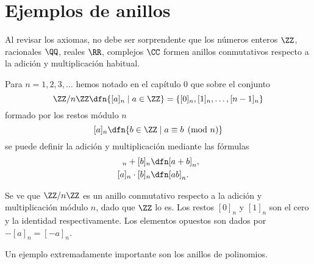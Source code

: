 
\section{Ejemplos de anillos}

\begin{ejemplo}
  Al revisar los axiomas, no debe ser sorprendente que los números enteros
  $\ZZ$, racionales $\QQ$, reales $\RR$, complejos $\CC$ formen anillos
  conmutativos respecto a la adición y multiplicación habitual.
\end{ejemplo}

\begin{ejemplo}
  \label{ejemplo:anillo-ZnZ}
  Para $n = 1, 2, 3, \ldots$ hemos notado en el capítulo 0 que sobre el conjunto
  $$\ZZ/n\ZZ \dfn \{ [a]_n \mid a \in \ZZ \} = \{ [0]_n, [1]_n, \ldots, [n-1]_n \}$$
  formado por los restos módulo $n$
  $$[a]_n \dfn \{ b\in \ZZ \mid a\equiv b \pmod{n} \}$$
  se puede definir la adición y multiplicación mediante las fórmulas
  \begin{align*}
    [a]_n + [b]_n & \dfn [a+b]_n,\\
    [a]_n \cdot [b]_n & \dfn [ab]_n.
  \end{align*}

  Se ve que $\ZZ/n\ZZ$ es un anillo conmutativo respecto a la adición y
  multiplicación módulo $n$, dado que $\ZZ$ lo es. Los restos $[0]_n$ y $[1]_n$
  son el cero y la identidad respectivamente. Los elementos opuestos son dados
  por $-[a]_n = [-a]_n$.
\end{ejemplo}

Un ejemplo extremadamente importante son los anillos de polinomios.


